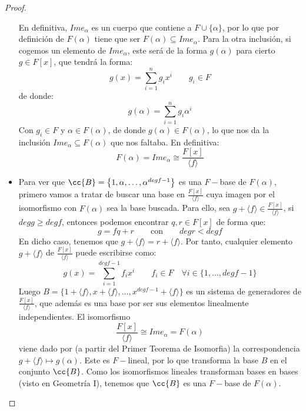 \begin{prop}
\begin{proof}
\begin{itemize}
                En definitiva, $Im e_\alpha$ es un cuerpo que contiene a $F\cup \{\alpha\}$, por lo que por definición de $F(\alpha)$ tiene que ser $F(\alpha) \subseteq Im e_\alpha$. Para la otra inclusión, si cogemos un elemento de $Im e_\alpha$, este será de la forma $g(\alpha)$ para cierto $g\in F[x]$, que tendrá la forma:
                \begin{equation*}
                    g(x) = \sum_{i=1}^{n} g_i x^i\qquad g_i \in F
                \end{equation*}
                de donde:
                \begin{equation*}
                    g(\alpha) = \sum_{i=1}^{n} g_i \alpha^i
                \end{equation*}
                Con $g_i \in F$ y $\alpha \in F(\alpha)$, de donde $g(\alpha) \in F(\alpha)$, lo que nos da la inclusión $Im e_\alpha\subseteq F(\alpha)$ que nos faltaba. En definitiva:
                \begin{equation*}
                    F(\alpha) = Im e_\alpha \cong \dfrac{F[x]}{\langle f \rangle }
                \end{equation*}
            \item Para ver que $\cc{B}=\left\{1,\alpha,\ldots, \alpha^{degf-1}\right\}$ es una $F-$base de $F(\alpha)$, primero vamos a tratar de buscar una base en $\frac{F[x]}{\langle f \rangle }$ cuya imagen por el isomorfismo con $F(\alpha)$ sea la base buscada. Para ello, sea $g+\langle f \rangle \in \frac{F[x]}{\langle f \rangle }$, si $deg g \geq deg f$, entonces podemos encontrar $q,r\in F[x]$ de forma que:
                \begin{equation*}
                    g = fq + r \qquad \text{con} \qquad degr < degf
                \end{equation*}
                En dicho caso, tenemos que $g+\langle f \rangle = r+ \langle f \rangle $. Por tanto, cualquier elemento $g+\langle f \rangle $ de $\frac{F[x]}{\langle f \rangle }$ puede escribirse como:
                \begin{equation*}
                    g(x) = \sum_{i=1}^{degf-1} f_ix^i \qquad f_i \in F \quad \forall i \in \{1,\ldots,degf-1\}
                \end{equation*}
                Luego $B=\{1+\langle f \rangle,x+\langle f \rangle, \ldots, x^{degf-1}+\langle f \rangle  \}$ es un sistema de generadores de $\frac{F[x]}{\langle f \rangle }$, que además es una base por ser sus elementos linealmente independientes. El isomorfismo 
                \begin{equation*}
                    \dfrac{F[x]}{\langle f \rangle }\cong Im e_\alpha  = F(\alpha)  
                \end{equation*}
                viene dado por (a partir del Primer Teorema de Isomorfia) la correspondencia $g+\langle f \rangle \mapsto g(\alpha)$. Este es $F-$lineal, por lo que transforma la base $B$ en el conjunto $\cc{B}$. Como los isomorfismos lineales transforman bases en bases (visto en Geometría I), tenemos que $\cc{B}$ es una $F-$base de $F(\alpha)$.
        \end{itemize}
    \end{proof}
\end{prop}
